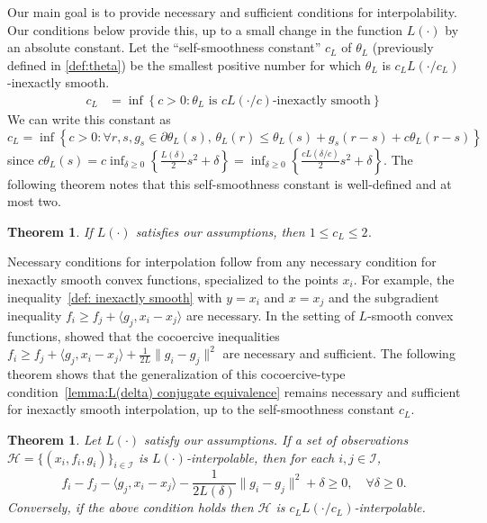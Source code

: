 \documentclass[11pt, hidelinks]{article}
\numberwithin{equation}{section}
\theoremstyle{thmstyletwo}%
\newtheorem{theorem}[thm]{Theorem}
\numberwithin{equation}{section}
\newcommand{\Ical}{\mathcal{I}}
\begin{document}
Our main goal is to provide necessary and sufficient conditions for interpolability. Our conditions below provide this, up to a small change in the function $L(\cdot)$ by an absolute constant. Let the ``self-smoothness constant'' $c_L$ of $\theta_L$ (previously defined in \eqref{def:theta}) be the smallest positive number for which $\theta_L$ is $c_LL(\cdot/c_L)$-inexactly smooth.
\begin{align}\label{primal-def-c_L-1D}
    c_L &= \inf \left\{c > 0: \theta_L \text{ is } cL(\cdot/c)\text{-inexactly smooth}\right\}
\end{align}
We can write this constant as $$c_L=\inf \left\{c > 0 : \forall r,s, g_s \in \partial \theta_L(s),\, \theta_L(r) \leq \theta_L(s)+g_s(r-s)+c\theta_L(r-s) \right\}$$
since $c \theta_L(s) = c \inf_{\delta \geq 0} \left\{\frac{L(\delta)}{2}s^2 + \delta\right\} = \inf_{\delta \geq 0} \left\{\frac{cL(\delta/c)}{2}s^2+\delta\right\}$.
The following theorem notes that this self-smoothness constant is well-defined and at most two.
\begin{theorem}\label{thm:finite-cL}
    If $L(\cdot)$ satisfies our assumptions, then $1 \leq c_L \leq 2$.
\end{theorem}

Necessary conditions for interpolation follow from any necessary condition for inexactly smooth convex functions, specialized to the points $x_i$. For example, the inequality~\eqref{def: inexactly smooth} with $y=x_i$ and $x=x_j$ and the subgradient inequality $f_i \geq f_j + \langle g_j,x_i-x_j\rangle$ are necessary. In the setting of $L$-smooth convex functions, \cite[Corollary 1]{taylor2017smooth} showed that the cocoercive inequalities $f_i \geq f_j + \langle g_j,x_i-x_j\rangle + \frac{1}{2L}\|g_i-g_j\|^2$ are necessary and sufficient.
The following theorem shows that the generalization of this cocoercive-type condition~\cref{lemma:L(delta) conjugate equivalence} remains necessary and sufficient for inexactly smooth interpolation, up to the self-smoothness constant $c_L$. 
 
\begin{theorem} \label{thm:interpolation-general}
   Let $L(\cdot)$ satisfy our assumptions. If a set of observations $\mathcal{H} =\{(x_i,f_i,g_i)\}_{i\in\Ical}$ is $L(\cdot)$-interpolable, then for each $i,j\in\Ical$,
\begin{equation}\label{eq:interpolation condition}
        f_i - f_j - \langle g_j, x_i-x_j\rangle - \frac{1}{2L(\delta)}\|g_i-g_j\|^2 + \delta \geq 0, \quad \forall \delta \geq 0 . 
    \end{equation} 
    Conversely, if the above condition holds then  $\mathcal{H}$ is ${c_L L(\cdot/c_L)}$-interpolable.
\end{theorem}
\end{document}
